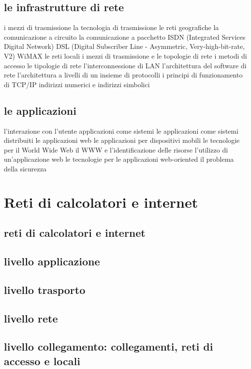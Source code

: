     \section{le infrastrutture di rete}
        i mezzi di trasmissione
        la tecnologia di trasmissione
        le reti geografiche
            la comunicazione a circuito
            la comunicazione a pacchetto
            ISDN (Integrated Services Digital Network)
            DSL (Digital Subscriber Line - Asymmetric, Very-high-bit-rate, V2)
            WiMAX
        le reti locali
            i mezzi di trasmissione e le topologie di rete
            i metodi di accesso
            le tipologie di rete
            l'interconnessione di LAN
        l'architettura del software di rete
            l'architettura a livelli di un insieme di protocolli
            i principi di funzionamento di TCP/IP
            indirizzi numerici e indirizzi simbolici
    \section{le applicazioni}
        l'interazione con l'utente 
        applicazioni come sistemi 
        le applicazioni come sistemi distribuiti 
            le applicazioni web 
        le applicazioni per dispositivi mobili 
        le tecnologie per il World Wide Web
            il WWW e l'identificazione delle risorse
            l'utilizzo di un'applicazione web
            le tecnologie per le applicazioni web-oriented
        il problema della sicurezza
\chapter{Reti di calcolatori e internet}
    \section{reti di calcolatori e internet}
    \section{livello applicazione}
    \section{livello trasporto}
    \section{livello rete}
    \section{livello collegamento: collegamenti, reti di accesso e locali}
